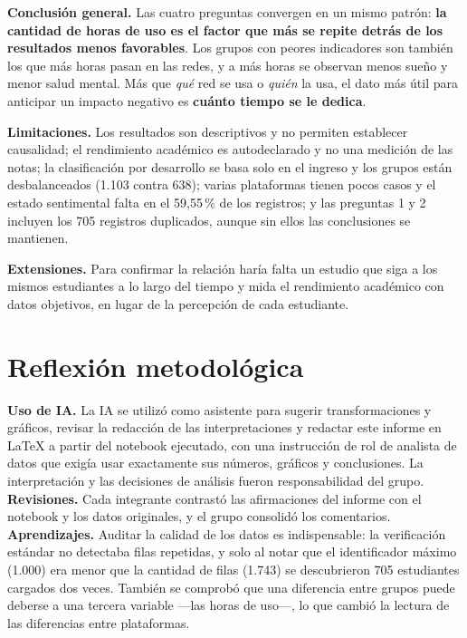 \documentclass[10pt,a4paper]{article}
\begin{document}
\begin{hallazgo}
\textbf{Conclusión general.} Las cuatro preguntas convergen en un mismo patrón: \textbf{la cantidad de horas
de uso es el factor que más se repite detrás de los resultados menos favorables}. Los grupos con peores
indicadores son también los que más horas pasan en las redes, y a más horas se observan menos sueño y menor
salud mental. Más que \emph{qué} red se usa o \emph{quién} la usa, el dato más útil para anticipar un impacto
negativo es \textbf{cuánto tiempo se le dedica}.
\end{hallazgo}

\textbf{Limitaciones.} Los resultados son descriptivos y no permiten establecer causalidad; el rendimiento
académico es autodeclarado y no una medición de las notas; la clasificación por desarrollo se basa solo en el
ingreso y los grupos están desbalanceados (1.103 contra 638); varias plataformas tienen pocos casos y el estado
sentimental falta en el 59,55\,\% de los registros; y las preguntas 1 y 2 incluyen los 705 registros
duplicados, aunque sin ellos las conclusiones se mantienen.

\textbf{Extensiones.} Para confirmar la relación haría falta un estudio que siga a los mismos estudiantes a lo
largo del tiempo y mida el rendimiento académico con datos objetivos, en lugar de la percepción de cada
estudiante.

\section{Reflexión metodológica}

\textbf{Uso de IA.} La IA se utilizó como asistente para sugerir transformaciones y gráficos, revisar la
redacción de las interpretaciones y redactar este informe en \LaTeX{} a partir del notebook ejecutado, con
una instrucción de rol de analista de datos que exigía usar exactamente sus números, gráficos y conclusiones.
La interpretación y las decisiones de análisis fueron responsabilidad del grupo.
\textbf{Revisiones.} Cada integrante contrastó las afirmaciones del informe con el notebook y los datos
originales, y el grupo consolidó los comentarios.
\textbf{Aprendizajes.} Auditar la calidad de los datos es indispensable: la verificación estándar no detectaba
filas repetidas, y solo al notar que el identificador máximo (1.000) era menor que la cantidad de filas
(1.743) se descubrieron 705 estudiantes cargados dos veces. También se comprobó que una diferencia entre
grupos puede deberse a una tercera variable —las horas de uso—, lo que cambió la lectura de las diferencias
entre plataformas.
\end{document}
